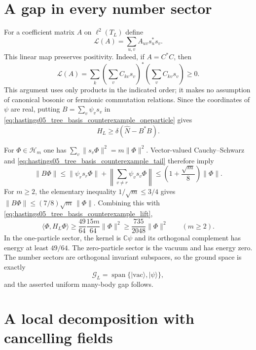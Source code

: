 \documentclass{article}
\providecommand{\C}{\mathbb C}
\providecommand{\cH}{\mathcal H}
\newcommand{\vac}{\mathrm{vac}}
\begin{document}
\section{A gap in every number sector}

For a coefficient matrix $A$ on $\ell^2(T_L)$ define
\[
 \mathcal L(A)=\sum_{u,v}A_{uv}s_u^*s_v.
\]
This linear map preserves positivity. Indeed, if $A=C^*C$, then
\[
 \mathcal L(A)=\sum_k\left(\sum_v C_{kv}s_v\right)^*
                         \left(\sum_v C_{kv}s_v\right)\ge0.
\]
This argument uses only products in the indicated order; it makes no
assumption of canonical bosonic or fermionic commutation relations.
Since the coordinates of $\psi$ are real, putting $B=\sum_v\psi_vs_v$
in \eqref{eq:hastings05_tree_basis_counterexample_oneparticle} gives
\begin{equation}
 H_L\ge\delta(\widehat N-B^*B).
 \label{eq:hastings05_tree_basis_counterexample_lift}
\end{equation}

For $\Phi\in\cH_m$ one has
$\sum_v\|s_v\Phi\|^2=m\|\Phi\|^2$. Vector-valued Cauchy--Schwarz and
\eqref{eq:hastings05_tree_basis_counterexample_tail} therefore imply
\[
 \|B\Phi\|\le\|\psi_rs_r\Phi\|
       +\left\|\sum_{v\ne r}\psi_vs_v\Phi\right\|
       \le\left(1+\frac{\sqrt m}{8}\right)\|\Phi\|.
\]
For $m\ge2$, the elementary inequality $1/\sqrt m\le3/4$ gives
$\|B\Phi\|\le(7/8)\sqrt m\,\|\Phi\|$.
Combining this with \eqref{eq:hastings05_tree_basis_counterexample_lift},
\[
 \langle\Phi,H_L\Phi\rangle
 \ge\frac{49}{64}\frac{15m}{64}\|\Phi\|^2
 \ge\frac{735}{2048}\|\Phi\|^2\qquad(m\ge2).
\]
In the one-particle sector, the kernel is $\C\psi$ and its orthogonal
complement has energy at least $49/64$. The zero-particle sector is the
vacuum and has energy zero. The number sectors are orthogonal invariant
subspaces, so the ground space is exactly
\begin{equation}
 \mathcal G_L=\operatorname{span}\{|\vac\rangle,|\psi\rangle\},
 \label{eq:hastings05_tree_basis_counterexample_ground}
\end{equation}
and the asserted uniform many-body gap follows.

\section{A local decomposition with cancelling fields}
\end{document}
